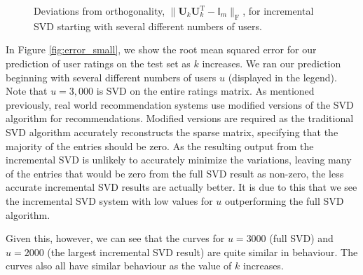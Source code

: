 \documentclass{article} %
\newcommand{\T}{\textrm{T}}
\begin{document}
\begin{figure}[H]
\begin{center}
\end{center}
\caption{Deviations from orthogonality, 
$\|\mathbf{U}_k\mathbf{U}_k^{\T} - \mathbb{I}_m\|_{\textrm{F}}$, for
incremental SVD starting with several different numbers of users.}
\label{fig:ortho_small}
\end{figure}

In Figure \ref{fig:error_small}, we show the root mean squared error for our prediction of user ratings on the test set as $k$ increases.
We ran our prediction beginning with several different numbers of users $u$ (displayed in the legend).
Note that $u = 3,000$ is SVD on the entire ratings matrix.
As mentioned previously, real world recommendation systems use modified versions of the SVD algorithm for recommendations.
Modified versions are required as the traditional SVD algorithm accurately reconstructs the sparse matrix, specifying that the majority of the entries should be zero.
As the resulting output from the incremental SVD is unlikely to accurately minimize the variations, leaving many of the entries that would be zero from the full SVD result as non-zero, the less accurate incremental SVD results are actually better.
It is due to this that we see the incremental SVD system with low values for $u$ outperforming the full SVD algorithm.

Given this, however, we can see that the curves for $u=3000$ (full SVD) and $u=2000$ (the largest incremental SVD result) are quite similar in behaviour.
The curves also all have similar behaviour as the value of $k$ increases.
\end{document}

